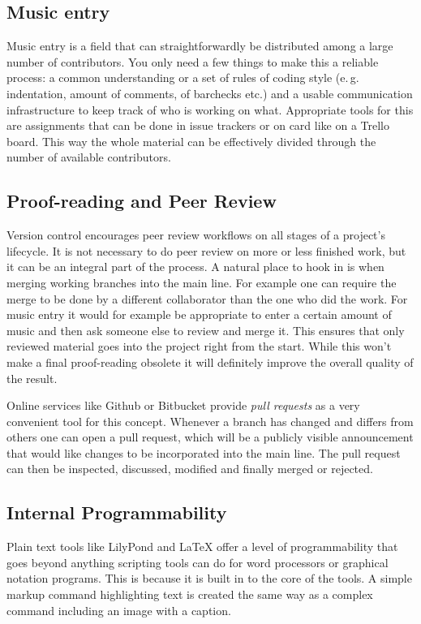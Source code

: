 \documentclass[11pt,a4paper]{article}
\begin{document}
\subsection{Music entry}
Music entry is a field that can straightforwardly be distributed among a large number
of contributors. You only need a few things to make this a reliable process: a common
understanding or a set of rules of coding style (e.\,g. indentation, amount of
comments, of barchecks etc.) and a usable communication infrastructure to keep track
of who is working on what. Appropriate tools for this are assignments that can be done in
issue trackers or on card like on a Trello board. This way the whole material can be
effectively divided through the number of available contributors.

\subsection{Proof-reading and Peer Review}
Version control encourages peer review workflows on all stages of a project's lifecycle.
It is not necessary to do peer review on more or less finished work, but it can be an
integral part of the process. A natural place to hook in is when merging working branches
into the main line. For example one can require the merge to be done by a different
collaborator than the one who did the work. For music entry it would for example be
appropriate to enter a certain amount of music and then ask someone else to review and
merge it. This ensures that only reviewed material goes into the project right from the
start. While this won't make a final proof-reading obsolete it will definitely improve
the overall quality of the result.

Online services like Github or Bitbucket provide \emph{pull requests} as a very convenient
tool for this concept. Whenever a branch has changed and differs from others one can
open a pull request, which will be a publicly visible announcement that would like changes
to be incorporated into the main line. The pull request can then be inspected, discussed,
modified and finally merged or rejected.

\subsection{Internal Programmability}
Plain text tools like LilyPond and \LaTeX{} offer a level of programmability that goes
beyond anything scripting tools can do for word processors or graphical notation programs.
This is because it is built in to the core of the tools. A simple
markup command highlighting text is created the same way as a complex
command including an image with a caption.
\end{document}
